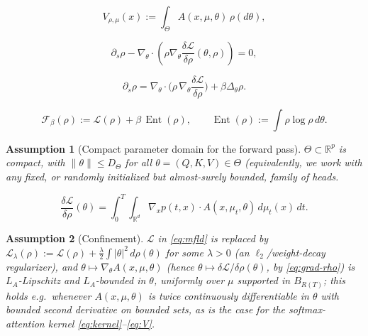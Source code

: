 \documentclass[10pt,a4paper]{amsart}
\newtheorem{assumption}{Assumption}
\DeclareMathOperator{\Ent}{Ent}
\newcommand{\R}{\mathbb{R}}
\begin{document}
\begin{equation}
V_{\rho,\mu}(x) := \int_\Theta A(x,\mu,\theta)\,\rho(d\theta),
\label{eq:V}
\end{equation}

\begin{equation}
\partial_s\rho - \nabla_\theta\cdot \left(\rho  \nabla_\theta\frac{\delta\mathcal L}{\delta\rho}(\theta,\rho) \right) = 0, 
\label{eq:training-transport}
\end{equation}

\begin{equation}
\partial_s\rho = \nabla_\theta\cdot\Big(\rho\,\nabla_\theta\frac{\delta\mathcal L}{\delta\rho}\Big) + \beta\Delta_\theta\rho.
\label{eq:mfld}
\end{equation}

\begin{equation}
\mathcal F_\beta(\rho) := \mathcal L(\rho) + \beta\,\Ent(\rho) , \qquad \Ent(\rho):=\int \rho\log\rho\, d\theta.
\label{eq:Fbeta}
\end{equation}

\begin{assumption}[Compact parameter domain for the forward pass]
\label{ass:compact-theta}
$\Theta\subset\R^p$ is compact, with $\|\theta\|\le D_\Theta$ for all $\theta=(Q,K,V)\in\Theta$ (equivalently, we work with any fixed, or randomly initialized but almost-surely bounded, family of heads. 
\end{assumption}

\begin{equation}
\frac{\delta\mathcal L}{\delta\rho}(\theta) = \int_0^T\!\!\int_{\R^d}  \nabla_x p(t,x)\cdot A(x,\mu_t,\theta)\,d\mu_t(x)\,dt.
\label{eq:grad-rho}
\end{equation}

\begin{assumption}[Confinement]
\label{ass:confine}
$\mathcal L$ in \eqref{eq:mfld} is replaced by $\mathcal L_\lambda(\rho):=\mathcal L(\rho) + \tfrac\lambda2\int|\theta|^2\,d\rho(\theta)$ for some $\lambda>0$ (an $\ell_2$/weight-decay regularizer), and $\theta\mapsto \nabla_\theta A(x,\mu,\theta)$ (hence $\theta\mapsto\delta\mathcal L/\delta\rho(\theta)$, by \eqref{eq:grad-rho}) is $L_A$-Lipschitz and $L_A$-bounded in $\theta$, uniformly over $\mu$ supported in $B_{R(T)}$; this holds e.g.\ whenever $A(x,\mu,\theta)$ is twice continuously differentiable in $\theta$ with bounded second derivative on bounded sets, as is the case for the softmax-attention kernel \eqref{eq:kernel}--\eqref{eq:V}.
\end{assumption}
\end{document}
